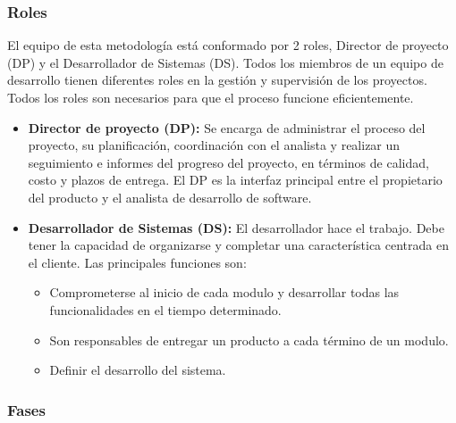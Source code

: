 \documentclass[12pt, openany, xcolor=table]{book}
\begin{document}
	\subsubsection{Roles}
	
	El equipo de esta metodología está conformado por 2 roles, Director de proyecto (DP) y el Desarrollador de Sistemas (DS). Todos los miembros de un equipo de desarrollo tienen diferentes roles en la gestión y supervisión de los proyectos. Todos los roles son necesarios para que el proceso funcione eficientemente. 
	
	\begin{itemize}
		\item \textbf{Director de proyecto (DP):} Se encarga de administrar el proceso del proyecto, su planificación, coordinación con el analista y realizar un seguimiento e informes del progreso del proyecto, en términos de calidad, costo y plazos de entrega. El DP es la interfaz principal entre el propietario del producto y el analista de desarrollo de software.
		
		\item \textbf{Desarrollador de Sistemas (DS):} El desarrollador hace el trabajo. Debe tener la capacidad de organizarse y completar una característica centrada en el cliente. Las principales funciones son:
		
		\begin{itemize}
			\item Comprometerse al inicio de cada modulo y desarrollar todas las funcionalidades en el tiempo determinado.
			
			\item Son responsables de entregar un producto a cada término de un modulo.
			
			\item Definir el desarrollo del sistema.
		\end{itemize} 
	\end{itemize}

	\subsubsection{Fases}
	
\end{document}
